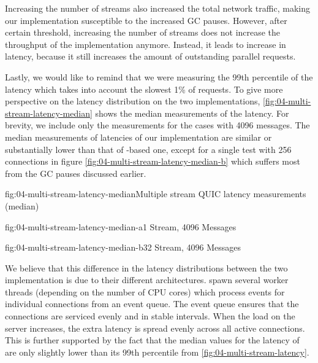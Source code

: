Increasing the number of streams also increased the total network traffic, making our implementation
susceptible to the increased GC pauses. However, after certain threshold, increasing the number of
streams does not increase the throughput of the implementation anymore. Instead, it leads to
increase in latency, because it still increases the amount of outstanding parallel requests.

Lastly, we would like to remind that we were measuring the 99th percentile of the latency which
takes into account the slowest 1\% of requests. To give more perspective on the latency distribution
on the two implementations, \autoref{fig:04-multi-stream-latency-median} shows the median
measurements of the latency. For brevity, we include only the measurements for the cases with
\SI{4096}{\byte} messages. The median measurements of latencies of our implementation are similar or
substantially lower than that of \libmsquic{}-based one, except for a single test with 256
connections in figure \autoref{fig:04-multi-stream-latency-median-b} which suffers most from the GC
pauses discussed earlier.

\begin{myFigure}{fig:04-multi-stream-latency-median}{Multiple stream QUIC latency measurements (median)}
\begin{mySubfigure}{0.49\linewidth}{fig:04-multi-stream-latency-median-a}{1 Stream, \SI{4096}{\byte} Messages}
\footnotesize

\end{mySubfigure}
\begin{mySubfigure}{0.49\linewidth}{fig:04-multi-stream-latency-median-b}{32 Stream, \SI{4096}{\byte} Messages}
\footnotesize

\end{mySubfigure}
\end{myFigure}

We believe that this difference in the latency distributions between the two implementation is due
to their different architectures. \libmsquic{} spawn several worker threads (depending on the number
of CPU cores) which process events for individual connections from an event queue. The event queue
ensures that the connections are serviced evenly and in stable intervals. When the load on the
server increases, the extra latency is spread evenly across all active connections. This is further
supported by the fact that the median values for the latency of \libmsquic{} are only slightly lower
than its 99th percentile from \autoref{fig:04-multi-stream-latency}.

